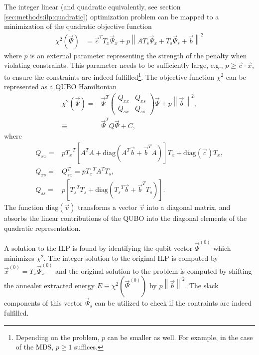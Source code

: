 \documentclass[prd,twocolumn,tightenlines,preprintnumbers,showpacs,superscriptaddress,notitlepage,nofootinbib,eqsecnum,floatfix,longbibliography,aps,10pt]{revtex4-2}
\begin{document}
The integer linear (and quadratic equivalently, see section \ref{sec:methods:ilp:quadratic}) optimization problem can be mapped to a minimization of the quadratic objective function
\begin{align}
 \chi^2(\vec \Psi)
 &=
 \vec c^T T_x \vec \Psi_x + p \left\| A T_s \vec \Psi_x + T_s \vec \Psi_s + \vec b \right\|^2
\end{align}
where $p$ is an external parameter representing the strength of the penalty when violating constraints.
This parameter needs to be sufficiently large, e.g., $p \geq \vec c \cdot \vec x$, to ensure the constraints are indeed fulfilled\footnote{Depending on the problem, $p$ can be smaller as well.
For example, in the case of the MDS, $p\geq 1$ suffices.}.
The objective function $\chi^2$ can be represented as a QUBO Hamiltonian
\begin{align}
 \chi^2(\vec \Psi) =    &
 \vec \Psi^T
 \begin{pmatrix}
  Q_{xx} & Q_{xs} \\
  Q_{sx} & Q_{ss}
 \end{pmatrix}
 \vec \Psi + p\left \| \vec b \right\|^2, \\
 \equiv &  \vec \Psi^T Q  \vec \Psi + C,
 \label{eq:matrix_form}
\end{align}
where
{\small
\begin{align}
 \label{eq:qubo:components}
 Q_{xx} = & p {T_{x}}^T \left[ A^T A + \mathrm{diag} \left(A^T \vec b + \vec b^T A\right) \right] T_x + \mathrm{diag}(\vec c) T_x,                                                                    \\
 Q_{xs} = & Q_{sx}^T = p {T_{x}}^T A^T T_s,                                                                     \\
 Q_{ss} = & p\left[ {T_{s}}^T T_s + \mathrm{diag}\left( {T_{s}}^T \vec b + \vec b^T T_s\right) \right].
\end{align}}
The function $\mathrm{diag}(\vec v)$ transforms a vector $\vec v$ into a diagonal matrix, and absorbs the linear contributions of the QUBO into the diagonal elements of the quadratic representation.

A solution to the ILP is found by identifying the qubit vector $\vec \Psi^{(0)}$ which minimizes $ \chi^2$.
The integer solution to the original ILP is computed by $\vec x^{(0)} = T_x \vec \Psi_x^{(0)}$ and the original solution to the problem is computed by shifting the annealer extracted energy $E \equiv  \chi^2(\vec \Psi^{(0)}) $ by $p \left \| \vec b \right\|^2$.
The slack components of this vector $\vec \Psi_s$ can be utilized to check if the contraints are indeed fulfilled.
\end{document}
